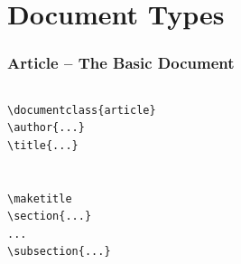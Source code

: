 
\section{Document Types}

\begin{frame}[fragile]
\frametitle{Article -- The Basic Document}

\begin{columns}
\begin{column}{.4\textwidth}
\begin{beamerboxesrounded}[width=\linewidth]{}
\begin{lstlisting}[moretexcs={chapter,subsection,maketitle}, basicstyle={\ttfamily}, emph={article}]
\documentclass{article}
\author{...}
\title{...}


\maketitle
\section{...}
...
\subsection{...}


\end{lstlisting}
\end{beamerboxesrounded}
\end{column}
\end{columns}
\end{frame}
